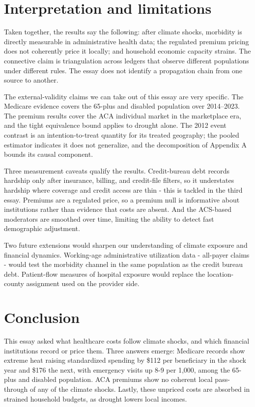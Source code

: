 \documentclass[a4paper,11pt]{article}
\begin{document}
\FloatBarrier
\section{Interpretation and limitations}

Taken together, the results say the following: after climate shocks, morbidity is directly measurable in administrative health data; the regulated premium pricing does not coherently price it locally; and household economic capacity strains. The connective claim is triangulation across ledgers that observe different populations under different rules. The essay does not identify a propagation chain from one source to another.

The external-validity claims we can take out of this essay are very specific. The Medicare evidence covers the 65-plus and disabled population over 2014--2023. The premium results cover the ACA individual market in the marketplace era, and the tight equivalence bound applies to drought alone. The 2012 event contrast is an intention-to-treat quantity for its treated geography; the pooled estimator indicates it does not generalize, and the decomposition of Appendix A bounds its causal component.

Three measurement caveats qualify the results. Credit-bureau debt records hardship only after insurance, billing, and credit-file filters, so it understates hardship where coverage and credit access are thin - this is tackled in the third essay. Premiums are a regulated price, so a premium null is informative about institutions rather than evidence that costs are absent. And the ACS-based moderators are smoothed over time, limiting the ability to detect fast demographic adjustment.

Two future extensions would sharpen our understanding of climate exposure and financial dynamics. Working-age administrative utilization data - all-payer claims - would test the morbidity channel in the same population as the credit bureau debt. Patient-flow measures of hospital exposure would replace the location-county assignment used on the provider side.

\FloatBarrier
\section{Conclusion}

This essay asked what healthcare costs follow climate shocks, and which financial institutions record or price them. Three answers emerge: Medicare records show extreme heat raising standardized spending by \$112 per beneficiary in the shock year and \$176 the next, with emergency visits up 8-9 per 1,000, among the 65-plus and disabled population. ACA premiums show no coherent local pass-through of any of the climate shocks. Lastly, these unpriced costs are absorbed in strained household budgets, as drought lowers local incomes.
\end{document}
